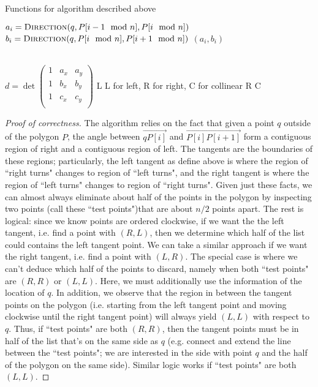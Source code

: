 \documentclass{article}
\begin{document}
\begin{enumerate}[(a)]
\begin{algorithm}[H]
\caption{Functions for algorithm described above}
\begin{algorithmic}[1]
\State $a_i = \textsc{Direction}(q, P[i-1 \mod n], P[i \mod n])$
\State $b_i = \textsc{Direction}(q, P[i \mod n], P[i+1 \mod n])$
\State \Return $(a_i,b_i)$

\EndFunction
\\
\State $d = \det
	\begin{pmatrix}
	1 & a_x & a_y \\
	1 & b_x & b_y \\
	1 & c_x & c_y \\
	\end{pmatrix}
	$
 \Return L \Comment L for left, R for right, C for collinear 
\EndIf
{} \Return R \EndIf
{} \Return C \EndIf
\EndFunction
\end{algorithmic}
\end{algorithm}

\begin{proof}[Proof of correctness]
The algorithm relies on the fact that given a point $q$ outside of the polygon $P$, the angle between $\overrightarrow{qP[i]}$ and $\overrightarrow{P[i]P[i+1]}$ form a contiguous region of right and a contiguous region of left. The tangents are the boundaries of these regions; particularly, the left tangent as define above is where the region of ``right turns" changes to region of ``left turns", and the right tangent is where the region of ``left turns" changes to region of ``right turns". Given just these facts, we can almost always eliminate about half of the points in the polygon by inspecting two points (call these ``test points")that are about $n/2$ points apart. The rest is logical: since we know points are ordered clockwise, if we want the the left tangent, i.e. find a point with $(R,L)$, then we determine which half of the list could contains the left tangent point. We can take a similar approach if we want the right tangent, i.e. find a point with $(L,R)$. The special case is where we can't deduce which half of the points to discard, namely when both ``test points" are $(R,R)$ or $(L,L)$. Here, we must additionally use the information of the location of $q$. In addition, we observe that the region in between the tangent points on the polygon (i.e. starting from the left tangent point and moving clockwise until the right tangent point) will always yield $(L,L)$ with respect to $q$. Thus, if ``test points" are both $(R,R)$, then the tangent points must be in half of the list that's on the same side as $q$ (e.g. connect and extend the line between the ``test points"; we are interested in the side with point $q$ and the half of the polygon on the same side). Similar logic works if ``test points" are both $(L,L)$.
\end{proof}


\end{enumerate}
\end{document}
